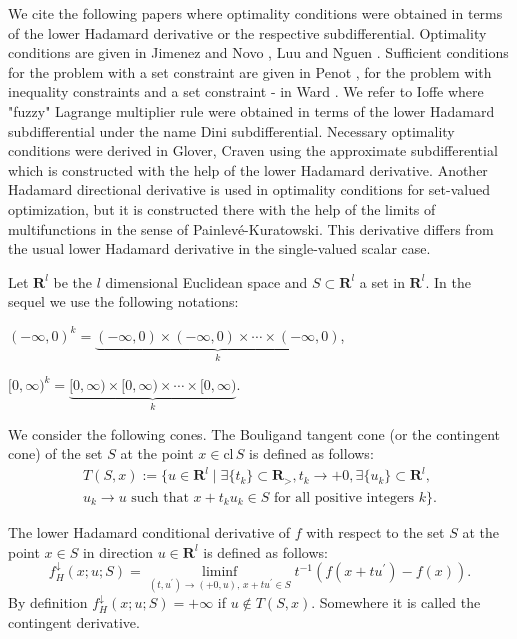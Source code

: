 \documentclass[12pt]{article}
\def\R{\mathbf R}
\def\E{\mathbf R^l}
\def\ld#1{#1^{\downarrow}_{H}}
\begin{document}
We cite the following papers where optimality conditions were obtained in
terms of the lower Hadamard derivative or the respective subdifferential.
Optimality conditions are given in  %
Jimenez and Novo \cite{jim02},
Luu and Nguen \cite{luu05}.
Sufficient conditions for the problem with a set constraint are given in Penot
\cite[Proposition 5.7(a)]{pen84}, for the problem with inequality constraints
and a set constraint - in Ward \cite[Corollary 3.1]{war88}.
We refer to Ioffe \cite[Proposition 6]{iof84} where "fuzzy" Lagrange
multiplier rule were obtained in terms of the lower Hadamard subdifferential
under the name Dini subdifferential.
Necessary optimality conditions were derived in Glover, Craven
\cite[Theorem 2.1]{glo94} using the approximate subdifferential which
is constructed with the help of the lower Hadamard derivative.
Another Hadamard directional derivative is used in optimality conditions for
set-valued optimization, but it is constructed there with the help of the
limits of multifunctions in the sense of Painlev\'e-Kuratowski. This derivative
differs from the usual lower Hadamard derivative in the single-valued scalar case.


Let $\E$ be the $l$ dimensional Euclidean space and $S\subset\E$ a set in $\E$.
In the sequel we use the following notations:

\centerline{
$(-\infty,0)^k=\underbrace{(-\infty,0)\times (-\infty,0)\times\cdots\times
(-\infty,0)}_k$,}

\centerline{
$[0,\infty)^k=\underbrace{[0,\infty)\times [0,\infty)\times\cdots\times
[0,\infty)}_k$.
}

We consider the following cones.
The Bouligand tangent cone (or the contingent cone) \cite{bou32} of the set $S$
at the point $x\in\mathrm{cl}\, S$ is defined as follows:
\[
\begin{array}{c}
T(S,x):=\{u\in\E\mid\exists \{t_k\}\subset\R_>, t_k\to +0,
\exists \{u_k\}\subset\E, \\
u_k\to u\textrm{ such that }
x+t_ku_k\in S\textrm{ for all positive integers }k\}.
\end{array}
\]

The lower Hadamard conditional derivative \cite{dem98} of $f$ with respect to
the set $S$ at the point $x\in S$ in direction $u\in\E$ is defined as follows:
\[
\ld f (x;u;S)=\liminf_{(t,u^\prime)\to (+0,u),\, x+tu^\prime\in S}
t^{-1}(f(x+tu^\prime)-f(x)).
\]
By definition $\ld f (x;u;S)=+\infty$ if $u\notin T(S,x)$.
Somewhere it is called the contingent derivative.
\end{document}
